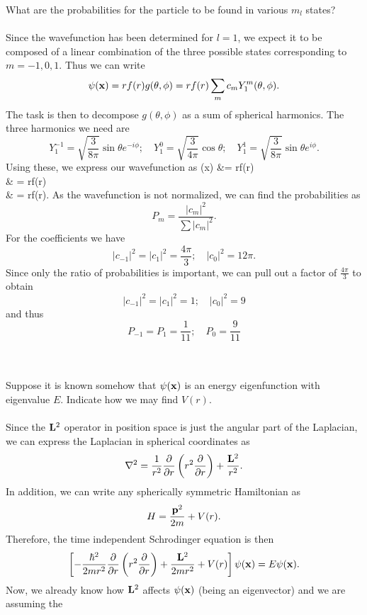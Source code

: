 \documentclass[11pt,letterpaper]{article}
\begin{document}
		What are the probabilities for the particle to be found in various $m_l$ states?
		\\
		\\
		Since the wavefunction has been determined for $l=1$, we expect it to be composed of a linear combination of
		the three possible states corresponding to $m=-1,0,1$. Thus we can write
		\[
			\psi(\mathbf{x}) = rf(r)g(\theta,\phi) = rf(r)\sum_{m}c_m Y_1^m(\theta,\phi).
		\] 
		The task is then to decompose $g(\theta,\phi)$ as a sum of spherical harmonics. The three harmonics we need are
		\[
			Y_1^{-1} = \sqrt{\frac{3}{8\pi}}\sin\theta e^{-i\phi};\quad 
			Y_1^0 = \sqrt{\frac{3}{4\pi}}\cos\theta;\quad 
			Y_1^1 = \sqrt{\frac{3}{8\pi}}\sin\theta e^{i\phi}.
		\]
		Using these, we express our wavefunction as
		\ba
			\psi(\vect x) &= rf(r)\\
			& = rf(r)\\
			& = rf(r).
		\ea
		As the wavefunction is not normalized, we can find the probabilities as
		\[	
			P_m = \frac{|c_m|^2}{\sum|c_m|^2}.
		\]
		For the coefficients we have
		\[
			|c_{-1}|^2 = |c_1|^2 =  \frac{4\pi}{3};\quad |c_0|^2 = 12\pi.
		\]
		Since only the ratio of probabilities is important, we can pull out a factor of $\frac{4\pi}{3}$ to obtain
		\[
			|c_{-1}|^2 = |c_1|^2 =  1;\quad |c_0|^2 = 9
		\]
		and thus
		\[
			P_{-1} = P_{1} = \frac{1}{11};\quad P_0 = \frac{9}{11}
		\]
		\\
		\\
		\item
		Suppose it is known somehow that $\psi(\mathbf{x})$ is an energy eigenfunction with eigenvalue $E$. Indicate how 
		we may find $V(r)$. 
		\\
		\\
		Since the $\mathbf{L}^2$ operator in position space is just the angular part of the Laplacian, we can express the Laplacian
		in spherical coordinates as
		\[
			\nabla^2 = \frac{1}{r^2}\frac{\partial}{\partial r} \left(r^2\frac{\partial}{\partial r}\right)+\frac{\mathbf{L}^2}{r^2}.
		\]
		In addition, we can write any spherically symmetric Hamiltonian as
		\[
			H = \frac{\mathbf{p}^2}{2m}+V(r) .
		\]
		Therefore, the time independent Schrodinger equation is then
		\[
			\left[-\frac{\hbar^2}{2mr^2}\frac{\partial}{\partial r} \left(r^2\frac{\partial}{\partial r}\right)+\frac{\mathbf{L}^2}{2mr^2}+V(r)\right]\psi(\mathbf{x}) = E\psi(\mathbf{x}).
		\]
		Now, we already know how $\mathbf{L}^2$ affects $\psi(\mathbf{x})$ (being an eigenvector) and we are assuming the
\end{document}
